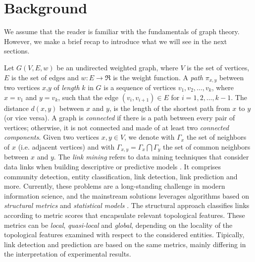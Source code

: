 \section{Background}
\label{sec:background}
We assume that the reader is familiar with the fundamentals of graph theory. 
However, we make a brief recap to introduce what we will see in the next sections.

Let $G(V,E,w)$ be an undirected weighted graph, where $V$ is the set of vertices, $E$ is the set of edges and $w:E\rightarrow\Re$ is the weight function. 
A \textit{path} $\pi_{x,y}$ between two vertices $x$,$y$ of \textit{length} $k$ in $G$ is a sequence of vertices $v_{1},v_{2},\ldots,v_{k}$, where $x = v_{1}$ and $y = v_{k}$, such that the edge $(v_{i},v_{i+1}) \in E$ for $i = 1, 2,\ldots,k-1$. 
The distance $d(x,y)$ between $x$ and $y$, is the length of the shortest path from $x$ to $y$ (or vice versa).
A graph is \textit{connected} if there is a path between every pair of vertices; otherwise, it is not connected and made of at least two \textit{connected components}.
Given two vertices $x,y \in V$, we denote with $\Gamma_{x}$ the set of neighbors of $x$ (i.e. adjacent vertices) and with $\Gamma_{x,y} = \Gamma_{x} \bigcap \Gamma_{y}$ the set of common neighbors between $x$ and $y$.
The \textit{link mining} refers to data mining techniques that consider data links when building descriptive or predictive models \cite{getoor2005link}. It comprises community detection, entity classification, link detection, link prediction and more. 
Currently, these problems are a long-standing challenge in modern information science, and the mainstream solutions leverages algorithms based on \textit{structural metrics} and \textit{statistical models} \cite{Liben-Nowell,Lu2011}.
The structural approach classifies links according to metric scores that encapsulate relevant topological features. 
These metrics can be \textit{local}, \textit{quasi-local} and \textit{global}, depending on the locality of the topological features examined with respect to the considered entities.
Tipically, link detection and prediction are based on the same metrics, mainly differing in the interpretation of experimental results.


